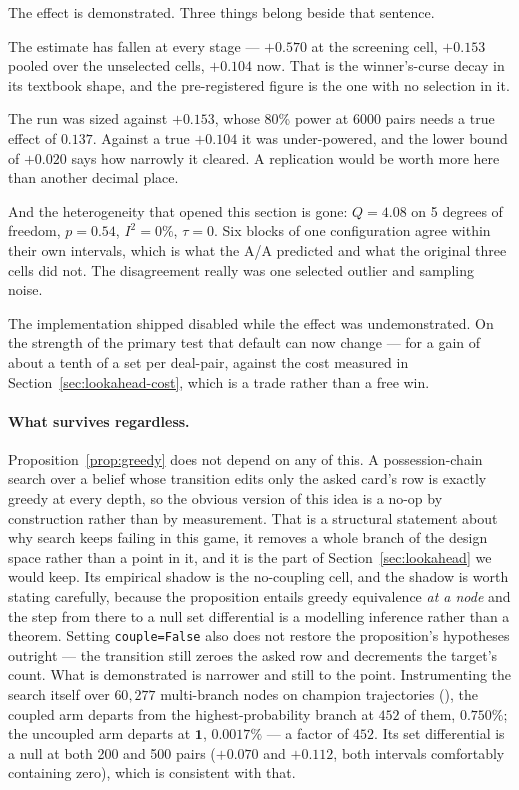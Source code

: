 \documentclass[11pt,letterpaper]{article}
\begin{document}
The effect is demonstrated. Three things belong beside that sentence.

The estimate has fallen at every stage --- $+0.570$ at the screening cell,
$+0.153$ pooled over the unselected cells, $+0.104$ now. That is the
winner's-curse decay in its textbook shape, and the pre-registered figure is the
one with no selection in it.

The run was sized against $+0.153$, whose 80\% power at 6000 pairs needs a true
effect of $0.137$. Against a true $+0.104$ it was under-powered, and the lower
bound of $+0.020$ says how narrowly it cleared. A replication would be worth
more here than another decimal place.

And the heterogeneity that opened this section is gone: $Q = 4.08$ on 5 degrees
of freedom, $p = 0.54$, $I^2 = 0\%$, $\tau = 0$. Six blocks of one configuration
agree within their own intervals, which is what the A/A predicted and what the
original three cells did not. The disagreement really was one selected outlier
and sampling noise.

The implementation shipped disabled while the effect was undemonstrated. On the
strength of the primary test that default can now change --- for a gain of about
a tenth of a set per deal-pair, against the cost measured in
Section~\ref{sec:lookahead-cost}, which is a trade rather than a free win.

\paragraph{What survives regardless.} Proposition~\ref{prop:greedy} does not
depend on any of this. A possession-chain search over a belief whose transition
edits only the asked card's row is exactly greedy at every depth, so the obvious
version of this idea is a no-op by construction rather than by measurement. That
is a structural statement about why search keeps failing in this game, it
removes a whole branch of the design space rather than a point in it, and it is
the part of Section~\ref{sec:lookahead} we would keep. Its empirical shadow is the
no-coupling cell, and the shadow is worth stating carefully, because the
proposition entails greedy equivalence \emph{at a node} and the step from there
to a null set differential is a modelling inference rather than a theorem.
Setting \texttt{couple=False} also does not restore the proposition's hypotheses
outright --- the transition still zeroes the asked row and decrements the
target's count. What is demonstrated is narrower and still to the point. Instrumenting the
search itself over $60{,}277$ multi-branch nodes on champion trajectories
(), the coupled arm departs from the
highest-probability branch at $452$ of them, $0.750\%$; the uncoupled arm
departs at $\mathbf{1}$, $0.0017\%$ --- a factor of $452$. Its set differential
is a null at both 200 and 500 pairs ($+0.070$ and $+0.112$, both intervals
comfortably containing zero), which is consistent with that.
\end{document}

